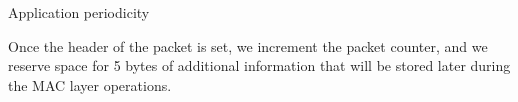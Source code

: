 \begin{DoxyRefList}
\item[\label{_l_k_n_code_edits__LKN_code_edits000008}%
\hypertarget{_l_k_n_code_edits__LKN_code_edits000008}{}%
Member \hyperlink{group__uinject_ga5b31a0d33a0be3a28d77fbdba9a3e2b7}{U\+I\+N\+J\+E\+C\+T\+\_\+\+P\+E\+R\+I\+O\+D\+\_\+\+MS} ]Application periodicity  
\item[\label{_l_k_n_code_edits__LKN_code_edits000007}%
\hypertarget{_l_k_n_code_edits__LKN_code_edits000007}{}%
Member \hyperlink{uinject_8c_a59951fd503ef80b9526ba1eaaf952d9b}{uinject\+\_\+task\+\_\+cb} ()]Once the header of the packet is set, we increment the packet counter, and we reserve space for 5 bytes of additional information that will be stored later during the M\+AC layer operations.
\end{DoxyRefList}